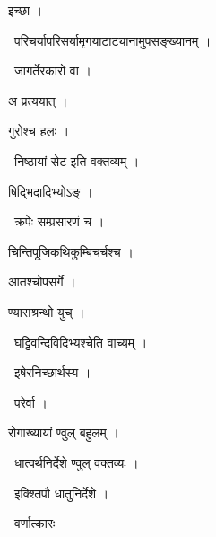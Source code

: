 \documentclass[10pt, openany, oneside]{book}
\begin{document}
\noindent इच्छा ।

\par\noindent\hspace{1.5em}{\vps वा॰}~{\qt परिचर्यापरिसर्यामृगयाटाट्यानामुपसङ्ख्यानम् ।}

\par\noindent\hspace{1.5em}{\vps वा॰}~{\qt जागर्तेरकारो वा ।}

\noindent अ प्रत्ययात् ।

\noindent गुरोश्च हलः ।

\par\noindent\hspace{1.5em}{\vps वा॰}~{\qt निष्ठायां सेट इति वक्तव्यम् ।}

\noindent षिद्भिदादिभ्योऽङ् ।

\par\noindent\hspace{1.5em}{\vps वा॰}~{\qt क्रपेः सम्प्रसारणं च ।}

\noindent चिन्तिपूजिकथिकुम्बिचर्चश्च ।

\noindent आतश्चोपसर्गे ।

\noindent ण्यासश्रन्थो युच् ।

\par\noindent\hspace{1.5em}{\vps वा॰}~{\qt घट्टिवन्दिविदिभ्यश्चेति वाच्यम् ।}

\par\noindent\hspace{1.5em}{\vps वा॰}~{\qt इषेरनिच्छार्थस्य ।}

\par\noindent\hspace{1.5em}{\vps वा॰}~{\qt परेर्वा ।}

\noindent रोगाख्यायां ण्वुल् बहुलम् ।

\par\noindent\hspace{1.5em}{\vps वा॰}~{\qt धात्वर्थनिर्देशे ण्वुल् वक्तव्यः ।}

\par\noindent\hspace{1.5em}{\vps वा॰}~{\qt इक्श्तिपौ धातुनिर्देशे ।}

\par\noindent\hspace{1.5em}{\vps वा॰}~{\qt वर्णात्कारः ।}
\end{document}
